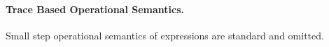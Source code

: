 \documentclass[a4paper,11pt]{article}
\begin{document}
\paragraph{Trace Based Operational Semantics.}
Small step operational semantics of expressions are standard and omitted.
%
\end{document}
